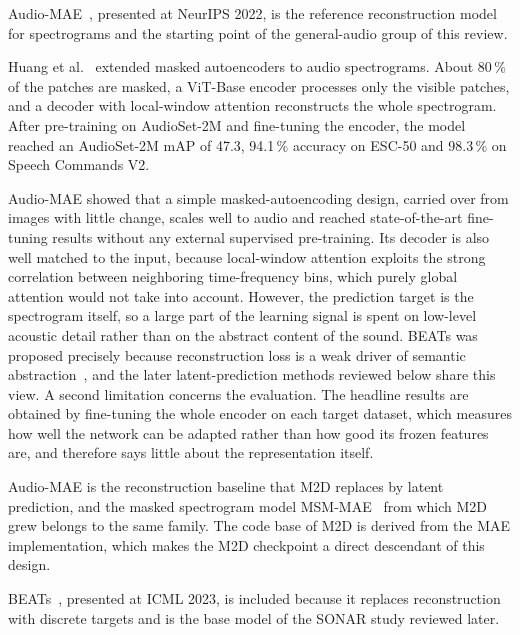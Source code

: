 \documentclass{FastFyp}
\begin{document}
Audio-MAE~\cite{ref:Huang:2022audiomae}, presented at NeurIPS 2022, is the reference reconstruction model for spectrograms and the starting point of the general-audio group of this review.

\lrsummary
Huang et al.~\cite{ref:Huang:2022audiomae} extended masked autoencoders to audio spectrograms. About 80\,\% of the patches are masked, a ViT-Base encoder processes only the visible patches, and a decoder with local-window attention reconstructs the whole spectrogram. After pre-training on AudioSet-2M and fine-tuning the encoder, the model reached an AudioSet-2M mAP of 47.3, 94.1\,\% accuracy on ESC-50 and 98.3\,\% on Speech Commands V2.

\lrcritical
Audio-MAE showed that a simple masked-autoencoding design, carried over from images with little change, scales well to audio and reached state-of-the-art fine-tuning results without any external supervised pre-training. Its decoder is also well matched to the input, because local-window attention exploits the strong correlation between neighboring time-frequency bins, which purely global attention would not take into account. However, the prediction target is the spectrogram itself, so a large part of the learning signal is spent on low-level acoustic detail rather than on the abstract content of the sound. BEATs was proposed precisely because reconstruction loss is a weak driver of semantic abstraction~\cite{ref:Chen:2023beats}, and the later latent-prediction methods reviewed below share this view. A second limitation concerns the evaluation. The headline results are obtained by fine-tuning the whole encoder on each target dataset, which measures how well the network can be adapted rather than how good its frozen features are, and therefore says little about the representation itself.

\lrrelation
Audio-MAE is the reconstruction baseline that M2D replaces by latent prediction, and the masked spectrogram model MSM-MAE~\cite{ref:Niizumi:2022msmmae} from which M2D grew belongs to the same family. The code base of M2D is derived from the MAE implementation, which makes the M2D checkpoint a direct descendant of this design.

BEATs~\cite{ref:Chen:2023beats}, presented at ICML 2023, is included because it replaces reconstruction with discrete targets and is the base model of the SONAR study reviewed later.
\end{document}
